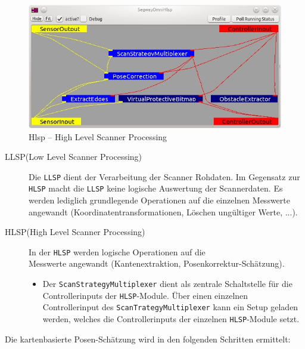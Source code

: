 \begin{figure}[h]
\center
\includegraphics[scale=0.7]{graphics/Hlsp.jpg}
\caption{\label{fig:Hlsp}Hlsp -- High Level Scanner Processing}
\end{figure}
 
\begin{description}
\item[LLSP(Low Level Scanner Processing)] Die \lstinline{LLSP} dient der
Verarbeitung der Scanner Rohdaten. Im Gegensatz zur \lstinline{HLSP} macht die
\lstinline{LLSP} keine logische Auswertung der Scannerdaten.
 Es werden lediglich grundlegende Operationen auf die einzelnen Messwerte angewandt
 (Koordinatentransformationen, Löschen ungültiger Werte, ...).
\item[HLSP(High Level Scanner Processing)] In der \lstinline{HLSP} werden
logische Operationen auf die\\ Messwerte angewandt (Kantenextraktion,
Posenkorrektur-Schätzung).
\begin{itemize}
  \item Der \lstinline{ScanStrategyMultiplexer} dient als zentrale Schaltstelle
  für die Controllerinputs der \lstinline{HLSP}-Module.
  Über einen einzelnen Controllerinput des \lstinline{ScanTrategyMultiplexer}
  kann ein Setup geladen werden, welches die Controllerinputs der einzelnen
 \lstinline{HLSP}-Module setzt.
\end{itemize}
\end{description}

Die kartenbasierte Posen-Schätzung wird in den folgenden Schritten ermittelt:

